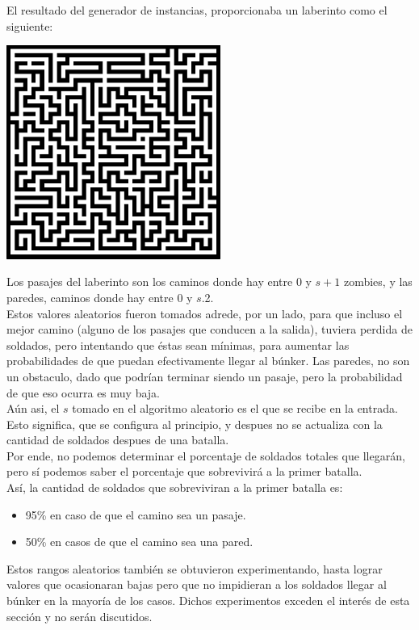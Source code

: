 El resultado del generador de instancias, proporcionaba un laberinto como el siguiente:

\begin{center}
\includegraphics[width=7cm,keepaspectratio=yes]{imagenes/ej2/maze.png}
\end{center}

Los pasajes del laberinto son los caminos donde hay entre $0$ y $s+1$ zombies, y las paredes, caminos donde hay entre $0$ y $s$.2.\\
Estos valores aleatorios fueron tomados adrede, por un lado, para que incluso el mejor camino (alguno de los pasajes que conducen a la salida), tuviera perdida de soldados, pero intentando que éstas sean mínimas, para aumentar las probabilidades de que puedan efectivamente llegar al búnker.
Las paredes, no son un obstaculo, dado que podrían terminar siendo un pasaje, pero la probabilidad de que eso ocurra es muy baja.\\
Aún asi, el $s$ tomado en el algoritmo aleatorio es el que se recibe en la entrada. Esto significa, que se configura al principio, y despues no se actualiza con la cantidad de soldados despues de una batalla.\\
Por ende, no podemos determinar el porcentaje de soldados totales que llegarán, pero sí podemos saber el porcentaje que sobrevivirá a la primer batalla.\\
Así, la cantidad de soldados que sobreviviran a la primer batalla es:
\begin{itemize}
	\item 95\% en caso de que el camino sea un pasaje.
	\item 50\% en casos de que el camino sea una pared.
\end{itemize}
Estos rangos aleatorios también se obtuvieron experimentando, hasta lograr valores que ocasionaran bajas pero que no impidieran a los soldados llegar al búnker en la mayoría de los casos. Dichos experimentos exceden el interés de esta sección y no serán discutidos.\\

